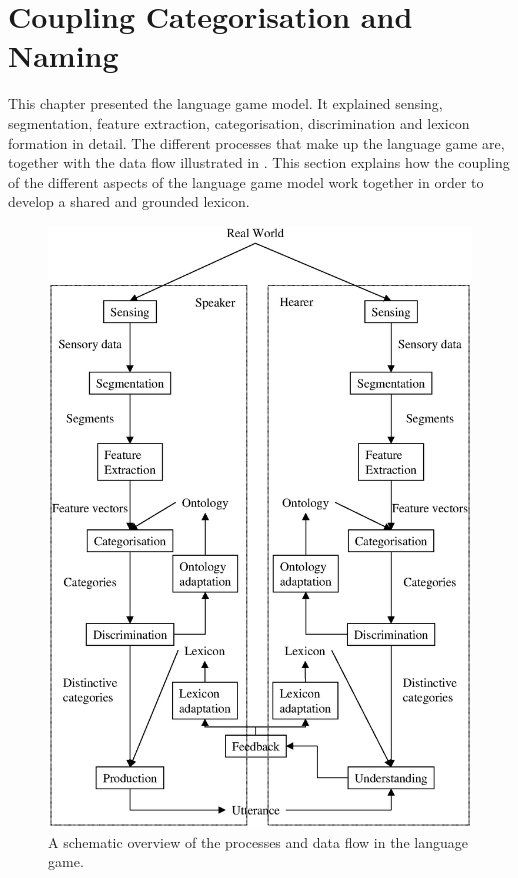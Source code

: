 \section{Coupling Categorisation and Naming}\label{s:coupling}

This chapter presented the language game model. It explained sensing, segmentation, feature extraction, categorisation, discrimination and lexicon formation in detail. The different processes that make up the language game are, together with the data flow illustrated in . This section explains how the coupling of the different aspects of the language game model work together in order to develop a shared and grounded lexicon.

\begin{figure}[p]
\centerline{\includegraphics[width=12cm]{lang_games/coupling.eps}}
\caption{A schematic overview of the processes and data flow in the language game.}
\label{f:lg:coupling}
\end{figure}


